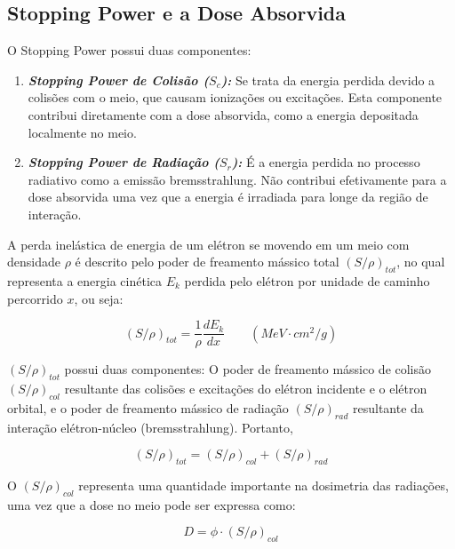 \documentclass[11pt,a4paper]{article}
\begin{document}
\subsection*{Stopping Power e a Dose Absorvida}

    O Stopping Power possui duas componentes:

    \begin{enumerate}
		\item \textbf{\textit{\textcolor{CarnationPink}{Stopping Power de Colisão ($S_c$)}:}} Se trata da energia perdida devido a colisões com o meio, que causam ionizações ou excitações. Esta componente contribui diretamente com a dose absorvida, como a energia depositada localmente no meio. 
		
		\item \textbf{\textit{\textcolor{CarnationPink}{Stopping Power de Radiação ($S_r$)}:}} É a energia perdida no processo radiativo como a emissão bremsstrahlung. Não contribui efetivamente para a dose absorvida uma vez que a energia é irradiada para longe da região de interação.
	\end{enumerate}

    A perda inelástica de energia de um elétron se movendo em um meio com densidade $\rho$ é descrito pelo poder de freamento mássico total $(S/\rho)_{tot}$, no qual representa a energia cinética $E_k$ perdida pelo elétron por unidade de caminho percorrido $x$, ou seja:

                \begin{equation}
                    (S/\rho)_{tot} = \frac{1}{\rho} \frac{d E_k}{d x} \qquad (MeV \cdot cm^2/g)
                \end{equation}

    $(S/\rho)_{tot}$ possui duas componentes: O poder de freamento mássico de colisão $(S/\rho)_{col}$ resultante das colisões e excitações do elétron incidente e o elétron orbital,  e o poder de freamento mássico de radiação $(S/\rho)_{rad}$ resultante da interação elétron-núcleo (bremsstrahlung). Portanto,

                \begin{equation}
                    (S/\rho)_{tot} = (S/\rho)_{col} + (S/\rho)_{rad}
                \end{equation}

    O $(S/\rho)_{col}$ representa uma quantidade importante na dosimetria das radiações, uma vez que a dose no meio pode ser expressa como:

                \begin{equation}
                    D = \phi \cdot (S/\rho)_{col}
                \end{equation}
\end{document}
